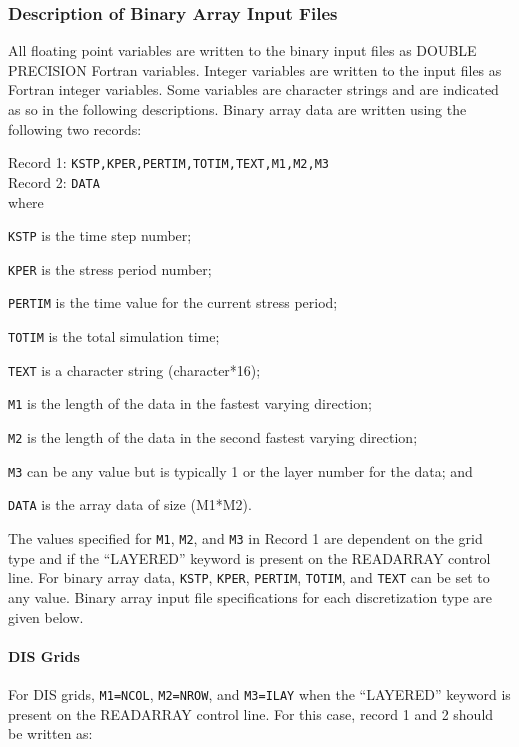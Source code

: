 \subsubsection{Description of Binary Array Input Files}
All floating point variables are written to the binary input files as DOUBLE PRECISION Fortran variables. Integer variables are written to the input files as Fortran integer variables. Some variables are character strings and are indicated as so in the following descriptions. Binary array data are written using the following two records:

\vspace{5mm}
\noindent Record 1: \texttt{KSTP,KPER,PERTIM,TOTIM,TEXT,M1,M2,M3} \\
\noindent Record 2: \texttt{DATA} \\

\vspace{5mm}
\noindent where

\begin{description} \itemsep0pt \parskip0pt 
\item \texttt{KSTP} is the time step number;
\item \texttt{KPER} is the stress period number;
\item \texttt{PERTIM} is the time value for the current stress period; 
\item \texttt{TOTIM} is the total simulation time;
\item \texttt{TEXT} is a character string (character*16);
\item \texttt{M1} is the length of the data in the fastest varying direction;
\item \texttt{M2} is the length of the data in the second fastest varying direction;
\item \texttt{M3} can be any value but is typically 1 or the layer number for the data; and
\item \texttt{DATA} is the array data of size (M1*M2).
\end{description}
 
\noindent The values specified for \texttt{M1}, \texttt{M2}, and \texttt{M3} in Record 1 are dependent on the grid type and if the ``LAYERED'' keyword is present on the READARRAY control line.  For binary array data, \texttt{KSTP}, \texttt{KPER}, \texttt{PERTIM}, \texttt{TOTIM}, and \texttt{TEXT} can be set to any value. Binary array input file specifications for each discretization type are given below.

\paragraph{DIS Grids}
For DIS grids,  \texttt{M1=NCOL}, \texttt{M2=NROW}, and \texttt{M3=ILAY} when the ``LAYERED'' keyword is present on the READARRAY control line. For this case, record 1 and 2 should be written as:

